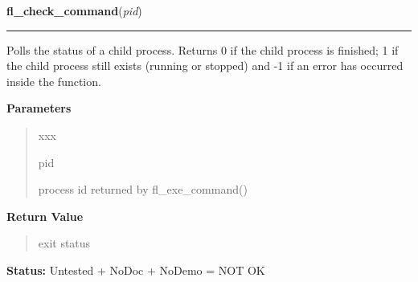 \hspace{.8\funcindent}\begin{boxedminipage}{\funcwidth}

    \raggedright \textbf{fl\_check\_command}(\textit{pid})

    \vspace{-1.5ex}

    \rule{\textwidth}{0.5\fboxrule}
\setlength{\parskip}{2ex}
    Polls the status of a child process. Returns 0 if the child process is 
    finished; 1 if the child process still exists (running or stopped) and 
    -1 if an error has occurred inside the function.

\setlength{\parskip}{1ex}
      \textbf{Parameters}
      \vspace{-1ex}

      \begin{quote}
        \begin{Ventry}{xxx}

          \item[pid]

          process id returned by fl\_exe\_command()

        \end{Ventry}

      \end{quote}

      \textbf{Return Value}
    \vspace{-1ex}

      \begin{quote}
      exit status

      \end{quote}

\textbf{Status:} Untested + NoDoc + NoDemo = NOT OK



    \end{boxedminipage}

    \label{xformslib:library:fl_popen}

    \vspace{0.5ex}


